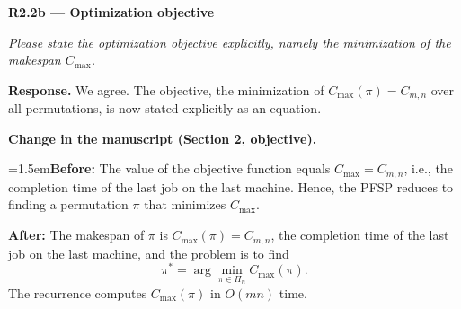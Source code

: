 \documentclass[12pt]{article}
\newenvironment{rc}[1]{\par\medskip\noindent\textbf{#1}\par\nopagebreak\noindent\itshape\renewcommand{\emph}[1]{\textbf{##1}}\ignorespaces}{\par}
\newcommand{\answer}[1]{\par\smallskip\noindent\textbf{Response.} #1\par}
\newcommand{\change}[3]{\par\smallskip\noindent\textbf{Change in the manuscript (#1).}\par
  {\leftskip=1.5em\noindent\textbf{Before:} #2\par\noindent\textbf{After:} #3\par}}
\newcommand{\Cmax}{C_{\max}}
\begin{document}
\begin{rc}{R2.2b --- Optimization objective}
Please state the optimization objective explicitly, namely the minimization of the makespan $\Cmax$.
\end{rc}
\answer{We agree. The objective, the minimization of $\Cmax(\pi)=C_{m,n}$ over all permutations, is now stated explicitly as an equation.}
\change{Section 2, objective}{The value of the objective function equals $C_{\max} = C_{m,n}$, i.e., the completion time of the last job on the last machine. Hence, the PFSP reduces to finding a permutation $\pi$ that minimizes $C_{\max}$.}{The makespan of $\pi$ is $C_{\max}(\pi)=C_{m,n}$, the completion time of the last job on the last machine, and the problem is to find
\begin{equation}
\pi^* = \arg\min_{\pi\in\Pi_n} C_{\max}(\pi).
\end{equation}
The recurrence computes $C_{\max}(\pi)$ in $O(mn)$ time.}
\end{document}
